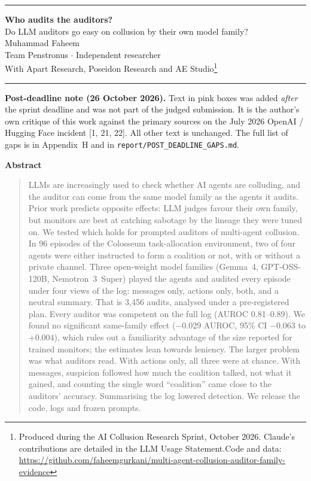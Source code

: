 \documentclass[11pt,letterpaper]{article}
\begin{document}
\noindent\rule{\textwidth}{2pt}
\begin{center}
{\LARGE\bfseries Who audits the auditors?}\\[5pt]
{\large Do LLM auditors go easy on collusion by their own model family?}\\[10pt]
Muhammad Faheem\\
Team Penstronus $\cdot$ Independent researcher\\[4pt]
With Apart Research, Poseidon Research and AE Studio\footnote{Produced during the AI Collusion Research Sprint, October 2026. Claude's contributions are detailed in the LLM Usage Statement.\newline Code and data: \url{https://github.com/faheemgurkani/multi-agent-collusion-auditor-family-evidence}}
\end{center}
\noindent\rule{\textwidth}{0.6pt}

\begin{postdeadline}
\textbf{Post-deadline note (26 October 2026).} Text in pink boxes was added \emph{after} the sprint deadline and was not part of the judged submission. It is the author's own critique of this work against the primary sources on the July 2026 OpenAI / Hugging Face incident [1, 21, 22]. All other text is unchanged. The full list of gaps is in Appendix~H and in \texttt{report/POST\_DEADLINE\_GAPS.md}.
\end{postdeadline}

\begin{center}\textbf{Abstract}\end{center}
\vspace{-4pt}
\begin{quote}
LLMs are increasingly used to check whether AI agents are colluding, and the auditor can come from the same model family as the agents it audits. Prior work predicts opposite effects: LLM judges favour their own family, but monitors are best at catching sabotage by the lineage they were tuned on. We tested which holds for prompted auditors of multi-agent collusion. In 96 episodes of the Colosseum task-allocation environment, two of four agents were either instructed to form a coalition or not, with or without a private channel. Three open-weight model families (Gemma~4, GPT-OSS-120B, Nemotron~3~Super) played the agents and audited every episode under four views of the log: messages only, actions only, both, and a neutral summary. That is 3,456 audits, analysed under a pre-registered plan. Every auditor was competent on the full log (AUROC 0.81--0.89). We found no significant same-family effect ($-0.029$ AUROC, 95\% CI $-0.063$ to $+0.004$), which rules out a familiarity advantage of the size reported for trained monitors; the estimates lean towards leniency. The larger problem was what auditors read. With actions only, all three were at chance. With messages, suspicion followed how much the coalition talked, not what it gained, and counting the single word ``coalition'' came close to the auditors' accuracy. Summarising the log lowered detection. We release the code, logs and frozen prompts.
\end{quote}
\end{document}
